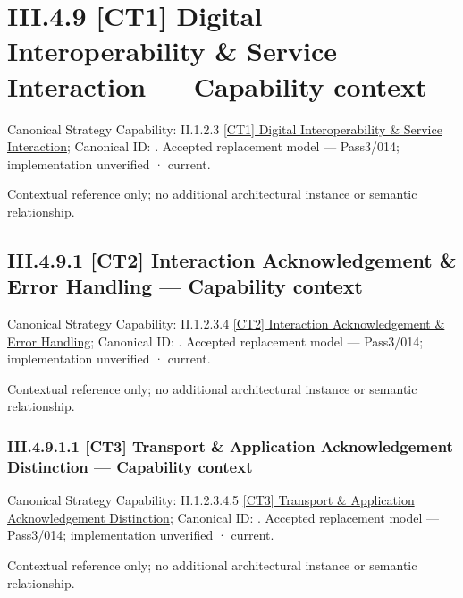 \section*{III.4.9 [CT1] Digital Interoperability \& Service Interaction — Capability context}
\label{navigation:III.4.9}

{\small Canonical Strategy Capability: II.1.2.3 \hyperref[element:2d94913dccc24c19804b426921f49a6b]{[CT1] Digital Interoperability \& Service Interaction}; Canonical ID: \texttt{}. Accepted replacement model — Pass3/014; implementation unverified · current.}\par
Contextual reference only; no additional architectural instance or semantic relationship.\par
\subsection*{III.4.9.1 [CT2] Interaction Acknowledgement \& Error Handling — Capability context}
\label{navigation:III.4.9.1}

{\small Canonical Strategy Capability: II.1.2.3.4 \hyperref[element:8bbc1201d917421ba7597aa341e850b6]{[CT2] Interaction Acknowledgement \& Error Handling}; Canonical ID: \texttt{}. Accepted replacement model — Pass3/014; implementation unverified · current.}\par
Contextual reference only; no additional architectural instance or semantic relationship.\par
\subsubsection*{III.4.9.1.1 [CT3] Transport \& Application Acknowledgement Distinction — Capability context}
\label{navigation:III.4.9.1.1}

{\small Canonical Strategy Capability: II.1.2.3.4.5 \hyperref[element:f726b4cecd714ab084e6cce3b0874e85]{[CT3] Transport \& Application Acknowledgement Distinction}; Canonical ID: \texttt{}. Accepted replacement model — Pass3/014; implementation unverified · current.}\par
Contextual reference only; no additional architectural instance or semantic relationship.\par
